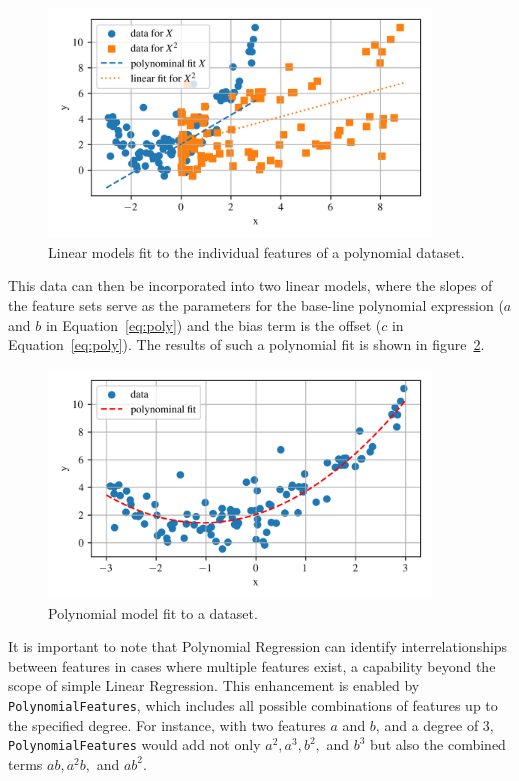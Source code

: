 \documentclass[12pt,letter]{article}
\begin{document}
		\begin{figure}[H]
			\centering
			\includegraphics[width=4in]{../figures/polynomial_regression_2}
			\caption{Linear models fit to the individual features of a polynomial dataset.}
			\label{fig:Polynomial_2}
		\end{figure}

This data can then be incorporated into two linear models, where the slopes of the feature sets serve as the parameters for the base-line polynomial expression ($a$ and $b$ in Equation~\ref{eq:poly}) and the bias term is the offset ($c$ in Equation~\ref{eq:poly}). The results of such a polynomial fit is shown in figure~\ref{fig:Polynomial_3}.


		\begin{figure}[H]
			\centering
			\includegraphics[width=4in]{../figures/polynomial_regression_3}
			\caption{Polynomial model fit to a dataset.}
			\label{fig:Polynomial_3}
		\end{figure}


It is important to note that Polynomial Regression can identify interrelationships between features in cases where multiple features exist, a capability beyond the scope of simple Linear Regression. This enhancement is enabled by \texttt{PolynomialFeatures}, which includes all possible combinations of features up to the specified degree. For instance, with two features $a$ and $b$, and a degree of 3, \texttt{PolynomialFeatures} would add not only $a^2, a^3, b^2,$ and $b^3$ but also the combined terms $ab, a^2b,$ and $ab^2$.
\end{document}
